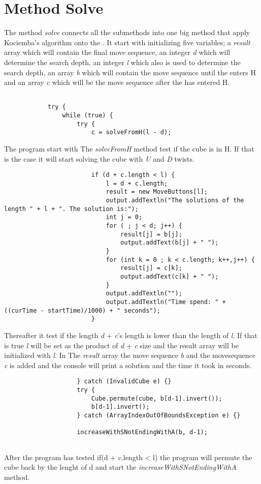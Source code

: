\section{Method Solve}


The method \textit{solve} connects all the submethods into one big method that apply Kociemba's algorithm onto the \rubik{}. 
It start with initializing five variables; 
a \textit{result} array which will contain the final move sequence, an integer \textit{d} which will determine the search depth, 
an integer \textit{l} which also is used to determine the search depth, 
an array \textit{b} which will contain the move sequence until the \rubik{} enters H 
and an array \textit{c} which will be the move sequence after the \rubik{} has entered H.

\begin{verbatim}
			
			try {
				while (true) {
					try {
						c = solveFromH(l - d);
\end{verbatim}
The program start with The \textit{solveFromH} method test if the cube is in H. If that is the case it will start solving the cube with \textit{U} and \textit{D} twists.

\begin{verbatim}
						if (d + c.length < l) {
							l = d + c.length;
							result = new MoveButtons[l];
							output.addTextln("The solutions of the length " + l + ". The solution is:");
							int j = 0;
							for ( ; j < d; j++) {
								result[j] = b[j];
								output.addText(b[j] + " ");
							}
							for (int k = 0 ; k < c.length; k++,j++) {
								result[j] = c[k];
								output.addText(c[k] + " ");
							}
							output.addTextln("");
							output.addTextln("Time spend: " + ((curTime - startTime)/1000) + " seconds");
						}
\end{verbatim}
Thereafter it test if the length \textit{d} + \textit{c}'s length is lower than the length of \textit{l}. 
If that is true \textit{l} will be set as the product of \textit{d} + \textit{c} size and the result array will be initialized with \textit{l}. 
In The \textit{result} array the move sequence \textit{b} and the movesequence \textit{c} is added and the console will print a solution and the time it took in seconds.

\begin{verbatim}
					} catch (InvalidCube e) {}
					try {
						Cube.permute(cube, b[d-1].invert());
						b[d-1].invert();
					} catch (ArrayIndexOutOfBoundsException e) {}

					increaseWithSNotEndingWithA(b, d-1);
					
\end{verbatim}
After the program has tested if(d + c.length < l) the program will permute the cube back by the lenght of d and start the \textit{increaseWithSNotEndingWithA} method.

